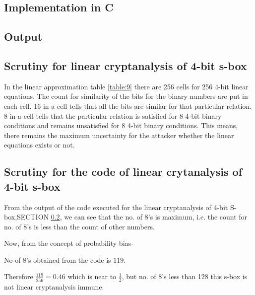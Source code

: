 \documentclass[12pt]{article}
\begin{document}
\subsection{Implementation in C}

\subsection{Output} \label{four}

\subsection{Scrutiny for linear cryptanalysis of 4-bit s-box}
In the linear approximation table \ref{table:9}  there are 256 cells for 256 4-bit linear equations. The count for similarity of the bits for the binary numbers are put in each cell. 16 in a cell tells that all the bits are similar for that particular relation. 8 in a cell tells that the particular relation is satisfied for 8 4-bit binary conditions and remains unsatisfied for 8 4-bit binary conditions. This means, there remains the maximum uncertainty for the attacker whether the linear equations exists or not.  
\subsection{Scrutiny for the code of linear crytanalysis of 4-bit s-box}
From the output of the code executed for the linear cryptanalysis of 4-bit S-box,SECTION \ref{four}, we can see that the no. of 8’s is maximum, i.e. the count for no. of 8’s is less than the count of other numbers.  

Now, from the concept of probability bias- 

No of 8’s obtained from the code is $ 119 $. 

Therefore $ \frac{119}{256}=0.46 $ which is near to $ \frac{1}{2} $, but no. of 8's less than 128 this s-box is not linear cryptanalysis immune.
\end{document}
